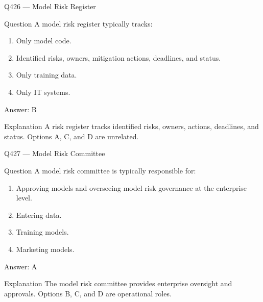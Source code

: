 \documentclass[aspectratio=169,8pt]{beamer}
\begin{document}
	\begin{frame}{Q426 --- Model Risk Register}
		\begin{block}{Question}
			A model risk register typically tracks:
			\begin{enumerate}
				\item Only model code.
				\item Identified risks, owners, mitigation actions, deadlines, and status.
				\item Only training data.
				\item Only IT systems.
			\end{enumerate}
		\end{block}
		\begin{exampleblock}{Answer: B}\end{exampleblock}
		\begin{block}{Explanation}
			A risk register tracks identified risks, owners, actions, deadlines, and status. Options A, C, and D are unrelated.
		\end{block}
	\end{frame}
	
	\begin{frame}{Q427 --- Model Risk Committee}
		\begin{block}{Question}
			A model risk committee is typically responsible for:
			\begin{enumerate}
				\item Approving models and overseeing model risk governance at the enterprise level.
				\item Entering data.
				\item Training models.
				\item Marketing models.
			\end{enumerate}
		\end{block}
		\begin{exampleblock}{Answer: A}\end{exampleblock}
		\begin{block}{Explanation}
			The model risk committee provides enterprise oversight and approvals. Options B, C, and D are operational roles.
		\end{block}
	\end{frame}
	
\end{document}
